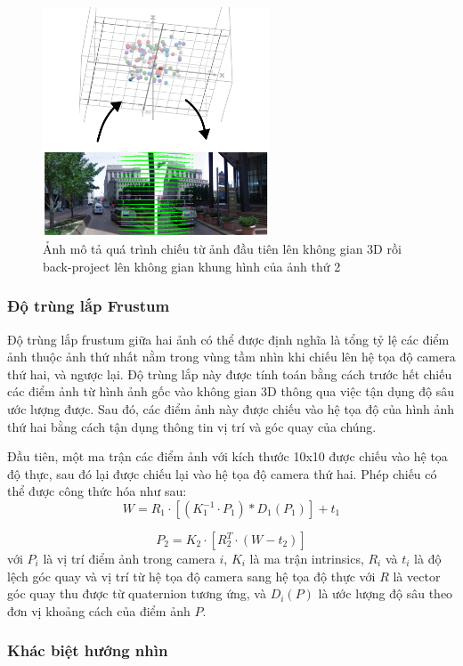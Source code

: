 \begin{figure}
  \centering
  \includegraphics[width=0.6\textwidth]{pics/Proposal/project.drawio.png}
  \caption[Quá trình chiếu giữa 2 ảnh]{Ảnh mô tả quá trình chiếu từ ảnh đầu tiên lên không gian 3D rồi back-project lên không gian khung hình của ảnh thứ 2}
\end{figure}

\subsubsection*{Độ trùng lắp Frustum}

Độ trùng lắp frustum giữa hai ảnh có thể được định nghĩa là tổng tỷ lệ các điểm ảnh thuộc ảnh thứ nhất nằm trong vùng tầm nhìn khi chiếu lên hệ tọa độ camera thứ hai, và ngược lại. Độ trùng lắp này được tính toán bằng cách trước hết chiếu các điểm ảnh từ hình ảnh gốc vào không gian 3D thông qua việc tận dụng độ sâu ước lượng được. Sau đó, các điểm ảnh này được chiếu vào hệ tọa độ của hình ảnh thứ hai bằng cách tận dụng thông tin vị trí và góc quay của chúng.

Đầu tiên, một ma trận các điểm ảnh với kích thước 10x10 được chiếu vào hệ tọa độ thực, sau đó lại được chiếu lại vào hệ tọa độ camera thứ hai. Phép chiếu có thể được công thức hóa như sau:
$$
W = R_1\cdot \left[(K_1^{-1} \cdot P_1)*D_1(P_1)\right] + t_1
$$

$$
P_2 = K_2 \cdot\left[R_2^{T} \cdot (W - t_2)\right]
$$
với $P_i$ là vị trí điểm ảnh trong camera $i$, $K_i$ là ma trận intrinsics, $R_i$ và $t_i$ là độ lệch góc quay và vị trí từ hệ tọa độ camera sang hệ tọa độ thực với $R$ là vector góc quay thu được từ quaternion tương ứng, và $D_i(P)$ là ước lượng độ sâu theo đơn vị khoảng cách của điểm ảnh $P$.

\subsubsection*{Khác biệt hướng nhìn}

